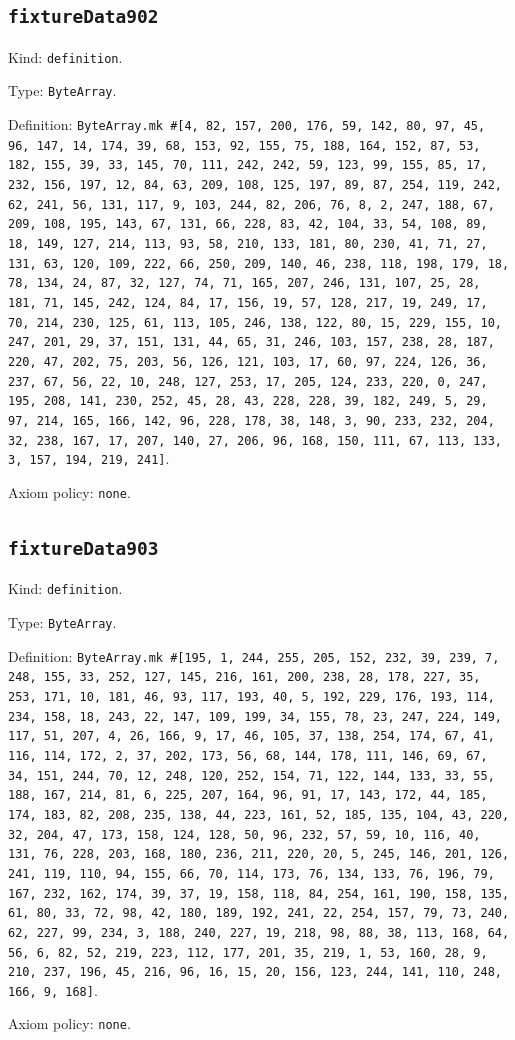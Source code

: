 \documentclass[11pt]{article}
\begin{document}
\subsection*{\texttt{fixtureData902}}
\noindent Kind: \texttt{definition}.\par
\noindent Type: \texttt{ByteArray}.\par
\noindent Definition: \texttt{ByteArray.mk \#[4, 82, 157, 200, 176, 59, 142, 80, 97, 45, 96, 147, 14, 174, 39, 68, 153, 92, 155, 75, 188, 164, 152, 87, 53, 182, 155, 39, 33, 145, 70, 111, 242, 242, 59, 123, 99, 155, 85, 17, 232, 156, 197, 12, 84, 63, 209, 108, 125, 197, 89, 87, 254, 119, 242, 62, 241, 56, 131, 117, 9, 103, 244, 82, 206, 76, 8, 2, 247, 188, 67, 209, 108, 195, 143, 67, 131, 66, 228, 83, 42, 104, 33, 54, 108, 89, 18, 149, 127, 214, 113, 93, 58, 210, 133, 181, 80, 230, 41, 71, 27, 131, 63, 120, 109, 222, 66, 250, 209, 140, 46, 238, 118, 198, 179, 18, 78, 134, 24, 87, 32, 127, 74, 71, 165, 207, 246, 131, 107, 25, 28, 181, 71, 145, 242, 124, 84, 17, 156, 19, 57, 128, 217, 19, 249, 17, 70, 214, 230, 125, 61, 113, 105, 246, 138, 122, 80, 15, 229, 155, 10, 247, 201, 29, 37, 151, 131, 44, 65, 31, 246, 103, 157, 238, 28, 187, 220, 47, 202, 75, 203, 56, 126, 121, 103, 17, 60, 97, 224, 126, 36, 237, 67, 56, 22, 10, 248, 127, 253, 17, 205, 124, 233, 220, 0, 247, 195, 208, 141, 230, 252, 45, 28, 43, 228, 228, 39, 182, 249, 5, 29, 97, 214, 165, 166, 142, 96, 228, 178, 38, 148, 3, 90, 233, 232, 204, 32, 238, 167, 17, 207, 140, 27, 206, 96, 168, 150, 111, 67, 113, 133, 3, 157, 194, 219, 241]}.\par
\noindent Axiom policy: \texttt{none}.\par
\subsection*{\texttt{fixtureData903}}
\noindent Kind: \texttt{definition}.\par
\noindent Type: \texttt{ByteArray}.\par
\noindent Definition: \texttt{ByteArray.mk \#[195, 1, 244, 255, 205, 152, 232, 39, 239, 7, 248, 155, 33, 252, 127, 145, 216, 161, 200, 238, 28, 178, 227, 35, 253, 171, 10, 181, 46, 93, 117, 193, 40, 5, 192, 229, 176, 193, 114, 234, 158, 18, 243, 22, 147, 109, 199, 34, 155, 78, 23, 247, 224, 149, 117, 51, 207, 4, 26, 166, 9, 17, 46, 105, 37, 138, 254, 174, 67, 41, 116, 114, 172, 2, 37, 202, 173, 56, 68, 144, 178, 111, 146, 69, 67, 34, 151, 244, 70, 12, 248, 120, 252, 154, 71, 122, 144, 133, 33, 55, 188, 167, 214, 81, 6, 225, 207, 164, 96, 91, 17, 143, 172, 44, 185, 174, 183, 82, 208, 235, 138, 44, 223, 161, 52, 185, 135, 104, 43, 220, 32, 204, 47, 173, 158, 124, 128, 50, 96, 232, 57, 59, 10, 116, 40, 131, 76, 228, 203, 168, 180, 236, 211, 220, 20, 5, 245, 146, 201, 126, 241, 119, 110, 94, 155, 66, 70, 114, 173, 76, 134, 133, 76, 196, 79, 167, 232, 162, 174, 39, 37, 19, 158, 118, 84, 254, 161, 190, 158, 135, 61, 80, 33, 72, 98, 42, 180, 189, 192, 241, 22, 254, 157, 79, 73, 240, 62, 227, 99, 234, 3, 188, 240, 227, 19, 218, 98, 88, 38, 113, 168, 64, 56, 6, 82, 52, 219, 223, 112, 177, 201, 35, 219, 1, 53, 160, 28, 9, 210, 237, 196, 45, 216, 96, 16, 15, 20, 156, 123, 244, 141, 110, 248, 166, 9, 168]}.\par
\noindent Axiom policy: \texttt{none}.\par
\end{document}
